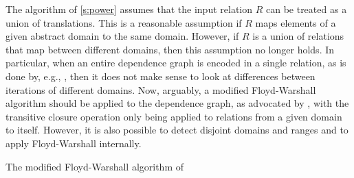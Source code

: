 The algorithm of \autoref{s:power} assumes that the input relation $R$
can be treated as a union of translations.
This is a reasonable assumption if $R$ maps elements of a given
abstract domain to the same domain.
However, if $R$ is a union of relations that map between different
domains, then this assumption no longer holds.
In particular, when an entire dependence graph is encoded
in a single relation, as is done by, e.g.,
\textcite[Section~6.1]{Barthou2000MSE}, then it does not make
sense to look at differences between iterations of different domains.
Now, arguably, a modified Floyd-Warshall algorithm should
be applied to the dependence graph, as advocated by
\textcite{Kelly1996closure}, with the transitive closure operation
only being applied to relations from a given domain to itself.
However, it is also possible to detect disjoint domains and ranges
and to apply Floyd-Warshall internally.

\LinesNumbered
\begin{algorithm}
\caption{The modified Floyd-Warshall algorithm of
\protect\textcite{Kelly1996closure}}
\label{a:Floyd}
%
\BlankLine
\SetAlgoVlined
\DontPrintSemicolon
%
\end{algorithm}

